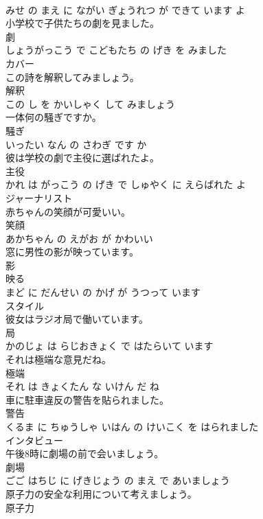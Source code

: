 \documentclass[8pt]{extreport}
\begin{document}
\begin{CJK}{UTF8}{min}
\\	みせ の まえ に ながい ぎょうれつ が できて います よ			
\\	小学校で子供たちの劇を見ました。	
\\	劇 
\\	しょうがっこう で こどもたち の げき を みました			
\\	カバー	
\\	この詩を解釈してみましょう。	
\\	解釈 
\\	この し を かいしゃく して みましょう			
\\	一体何の騒ぎですか。	
\\	騒ぎ 
\\	いったい なん の さわぎ です か			
\\	彼は学校の劇で主役に選ばれたよ。	
\\	主役 
\\	かれ は がっこう の げき で しゅやく に えらばれた よ			
\\	ジャーナリスト	
\\	赤ちゃんの笑顔が可愛いい。	
\\	笑顔 
\\	あかちゃん の えがお が かわいい			
\\	窓に男性の影が映っています。	
\\	影 
\\	映る 
\\	まど に だんせい の かげ が うつって います			
\\	スタイル	
\\	彼女はラジオ局で働いています。	
\\	局 
\\	かのじょ は らじおきょく で はたらいて います			
\\	それは極端な意見だね。	
\\	極端 
\\	それ は きょくたん な いけん だ ね			
\\	車に駐車違反の警告を貼られました。	
\\	警告 
\\	くるま に ちゅうしゃ いはん の けいこく を はられました			
\\	インタビュー	
\\	午後8時に劇場の前で会いましょう。	
\\	劇場 
\\	ごご はちじ に げきじょう の まえ で あいましょう			
\\	原子力の安全な利用について考えましょう。	
\\	原子力 

\end{CJK}
\end{document}
